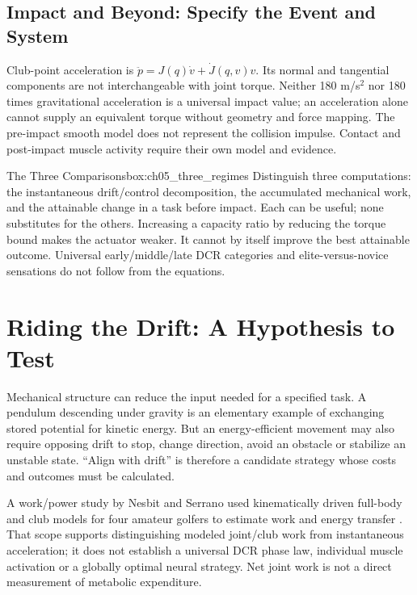 \subsection*{Impact and Beyond: Specify the Event and System}
Club-point acceleration is $\ddot p=J(q)\dot v+\dot J(q,v)v$. Its normal and tangential components are not interchangeable with joint torque. Neither 180 m/s$^2$ nor 180 times gravitational acceleration is a universal impact value; an acceleration alone cannot supply an equivalent torque without geometry and force mapping. The pre-impact smooth model does not represent the collision impulse. Contact and post-impact muscle activity require their own model and evidence.

\begin{laymansbox}{The Three Comparisons}{box:ch05_three_regimes}
Distinguish three computations: the instantaneous drift/control decomposition, the accumulated mechanical work, and the attainable change in a task before impact. Each can be useful; none substitutes for the others. Increasing a capacity ratio by reducing the torque bound makes the actuator weaker. It cannot by itself improve the best attainable outcome. Universal early/middle/late DCR categories and elite-versus-novice sensations do not follow from the equations.
\end{laymansbox}

\section{Riding the Drift: A Hypothesis to Test}
Mechanical structure can reduce the input needed for a specified task. A pendulum descending under gravity is an elementary example of exchanging stored potential for kinetic energy. But an energy-efficient movement may also require opposing drift to stop, change direction, avoid an obstacle or stabilize an unstable state. ``Align with drift'' is therefore a candidate strategy whose costs and outcomes must be calculated.

A work/power study by Nesbit and Serrano used kinematically driven full-body and club models for four amateur golfers to estimate work and energy transfer \citep{Nesbit2005b}. That scope supports distinguishing modeled joint/club work from instantaneous acceleration; it does not establish a universal DCR phase law, individual muscle activation or a globally optimal neural strategy. Net joint work is not a direct measurement of metabolic expenditure.

